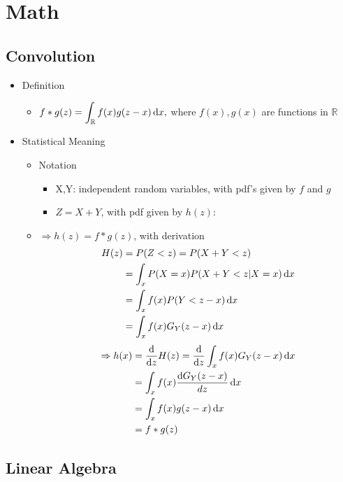 \chapter{Math}

\section{Convolution}

\begin{itemize}
\item Definition
	\begin{itemize}
	\item $\displaystyle f* g (z) = \int_{\mathbb R}f(x)g(z-x) \mathop{}\!\mathrm{d} x,$ where $f(x),g(x)$ are functions in $\mathbb R$
	\end{itemize}
	
\item Statistical Meaning
	\begin{itemize}
	\item Notation
		\begin{itemize}
		\item X,Y: independent random variables, with pdf's given by $f$ and $g$
		\item $Z = X+Y$, with pdf given by $h(z)$:
		\end{itemize}
		
	\item $\Rightarrow h(z) = f * g (z)$, with derivation
	\begin{align*} H(z) &= P(Z<z) = P(X+Y<z) \\ &= \int_x P(X=x)P(X+Y<z|X=x) \mathop{}\!\mathrm{d} x \\ &= \int_x f(x)P(Y<z-x)\mathop{}\!\mathrm{d} x \\ &= \int_x f(x)G_Y(z-x)\mathop{}\!\mathrm{d} x  \end{align*} 
	\begin{align*} \Rightarrow h(x) &= \frac \D {\D z} H(z) = \frac \D {\D z} \int_x f(x)G_Y(z-x)\D x \\ &= \int_x f(x) \frac {\D G_Y(z-x)}{dz} \D x \\ &= \int_x f(x) g(z-x)\D x \\ &= f * g (z) \end{align*}
	\end{itemize}
\end{itemize}
 
\section{Linear Algebra}


